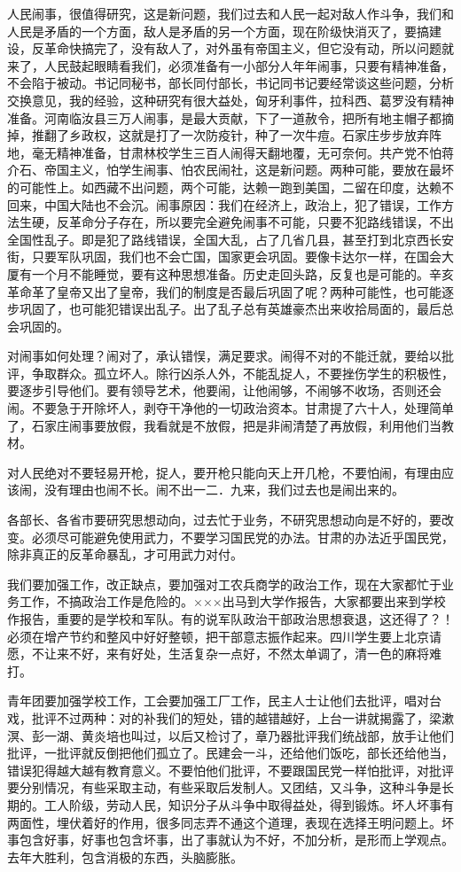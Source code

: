 人民闹事，很值得研究，这是新问题，我们过去和人民一起对敌人作斗争，我们和人民是矛盾的一个方面，敌人是矛盾的另一个方面，现在阶级快消灭了，要搞建设，反革命快搞完了，没有敌人了，对外虽有帝国主义，但它没有动，所以问题就来了，人民鼓起眼睛看我们，必须准备有一小部分人年年闹事，只要有精神准备，不会陷于被动。书记同秘书，部长同付部长，书记同书记要经常谈这些问题，分析交换意见，我的经验，这种研究有很大益处，匈牙利事件，拉科西、葛罗没有精神准备。河南临汝县三万人闹事，是最大贡献，下了一道赦令，把所有地主帽子都摘掉，推翻了乡政权，这就是打了一次防疫针，种了一次牛痘。石家庄步步放弃阵地，毫无精神准备，甘肃林校学生三百人闹得天翻地覆，无可奈何。共产党不怕蒋介石、帝国主义，怕学生闹事、怕农民闹社，这是新问题。两种可能，要放在最坏的可能性上。如西藏不出问题，两个可能，达赖一跑到美国，二留在印度，达赖不回来，中国大陆也不会沉。闹事原因：我们在经济上，政治上，犯了错误，工作方法生硬，反革命分子存在，所以要完全避免闹事不可能，只要不犯路线错误，不出全国性乱子。即是犯了路线错误，全国大乱，占了几省几县，甚至打到北京西长安街，只要军队巩固，我们也不会亡国，国家更会巩固。要像卡达尔一样，在国会大厦有一个月不能睡觉，要有这种思想准备。历史走回头路，反复也是可能的。辛亥革命革了皇帝又出了皇帝，我们的制度是否最后巩固了呢？两种可能性，也可能逐步巩固了，也可能犯错误出乱子。出了乱子总有英雄豪杰出来收拾局面的，最后总会巩固的。

对闹事如何处理？闹对了，承认错悮，满足要求。闹得不对的不能迁就，要给以批评，争取群众。孤立坏人。除行凶杀人外，不能乱捉人，不要挫伤学生的积极性，要逐步引导他们。要有领导艺术，他要闹，让他闹够，不闹够不收场，否则还会闹。不要急于开除坏人，剥夺干净他的一切政治资本。甘肃提了六十人，处理简单了，石家庄闹事要放假，我看就是不放假，把是非闹清楚了再放假，利用他们当教材。

对人民绝对不要轻易开枪，捉人，要开枪只能向天上开几枪，不要怕闹，有理由应该闹，没有理由也闹不长。闹不出一二．九来，我们过去也是闹出来的。

各部长、各省市要研究思想动向，过去忙于业务，不研究思想动向是不好的，要改变。必须尽可能避免使用武力，不要学习国民党的办法。甘肃的办法近乎国民党，除非真正的反革命暴乱，才可用武力对付。

我们要加强工作，改正缺点，要加强对工农兵商学的政治工作，现在大家都忙于业务工作，不搞政治工作是危险的。×××出马到大学作报告，大家都要出来到学校作报告，重要的是学校和军队。有的说军队政治干部政治思想衰退，这还得了？！必须在增产节约和整风中好好整顿，把干部意志振作起来。四川学生要上北京请愿，不让来不好，来有好处，生活复杂一点好，不然太单调了，清一色的麻将难打。

青年团要加强学校工作，工会要加强工厂工作，民主人士让他们去批评，唱对台戏，批评不过两种：对的补我们的短处，错的越错越好，上台一讲就揭露了，梁漱溟、彭一湖、黄炎培也叫过，以后又检讨了，章乃器批评我们统战部，放手让他们批评，一批评就反倒把他们孤立了。民建会一斗，还给他们饭吃，部长还给他当，错误犯得越大越有教育意义。不要怕他们批评，不要跟国民党一样怕批评，对批评要分别情况，有些采取主动，有些采取后发制人。又团结，又斗争，这种斗争是长期的。工人阶级，劳动人民，知识分子从斗争中取得益处，得到锻炼。坏人坏事有两面性，埋伏着好的作用，很多同志弄不通这个道理，表现在选择王明问题上。坏事包含好事，好事也包含坏事，出了事就认为不好，不加分析，是形而上学观点。去年大胜利，包含消极的东西，头脑膨胀。

